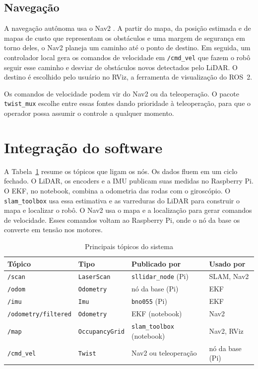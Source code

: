 \subsection{Navegação}

A navegação autônoma usa o Nav2 \cite{macenski2020nav2}. A partir do mapa,
da posição estimada e de mapas de custo que representam os obstáculos e
uma margem de segurança em torno deles, o Nav2 planeja um caminho até o
ponto de destino. Em seguida, um controlador local gera os comandos de
velocidade em \texttt{/cmd\_vel} que fazem o robô seguir esse caminho e
desviar de obstáculos novos detectados pelo LiDAR. O destino é escolhido
pelo usuário no RViz, a ferramenta de visualização do ROS~2.

Os comandos de velocidade podem vir do Nav2 ou da teleoperação. O pacote
\texttt{twist\_mux} escolhe entre essas fontes dando prioridade à
teleoperação, para que o operador possa assumir o controle a qualquer
momento.

\section{Integração do software}
\label{sec:integracao-sw}

A Tabela~\ref{tab:topicos} resume os tópicos que ligam os nós. Os dados
fluem em um ciclo fechado. O LiDAR, os encoders e a IMU publicam suas
medidas no Raspberry Pi. O EKF, no notebook, combina a odometria das
rodas com o giroscópio. O \texttt{slam\_toolbox} usa essa estimativa e as
varreduras do LiDAR para construir o mapa e localizar o robô. O Nav2 usa
o mapa e a localização para gerar comandos de velocidade. Esses comandos
voltam ao Raspberry Pi, onde o nó da base os converte em tensão nos
motores.

\begin{table}[htb]
	\centering
	\caption{Principais tópicos do sistema}
	\label{tab:topicos}
	\begin{tabular}{|l|l|l|l|}
		\hline
		\textbf{Tópico} & \textbf{Tipo} & \textbf{Publicado por} & \textbf{Usado por} \\ \hline
		\texttt{/scan} & \texttt{LaserScan} & \texttt{sllidar\_node} (Pi) & SLAM, Nav2 \\ \hline
		\texttt{/odom} & \texttt{Odometry} & nó da base (Pi) & EKF \\ \hline
		\texttt{/imu} & \texttt{Imu} & \texttt{bno055} (Pi) & EKF \\ \hline
		\texttt{/odometry/filtered} & \texttt{Odometry} & EKF (notebook) & Nav2 \\ \hline
		\texttt{/map} & \texttt{OccupancyGrid} & \texttt{slam\_toolbox} (notebook) & Nav2, RViz \\ \hline
		\texttt{/cmd\_vel} & \texttt{Twist} & Nav2 ou teleoperação & nó da base (Pi) \\ \hline
	\end{tabular}
\end{table}

